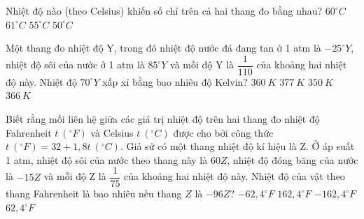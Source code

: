 \begin{vidu}
\begin{vdc}
 	\end{vdc}
 	\begin{vdc}
 		Nhiệt độ nào (theo Celsius) khiến số chỉ trên cả hai thang đo bằng nhau?
 		\choice
 		{$60^\circ C$}
 		{$61^\circ C$}
 		{$55^\circ C$}
 		{\True $50^\circ C$}

 	\end{vdc}
 \end{vidu}
 

\begin{vidu} 
	Một thang đo nhiệt độ Y, trong đó nhiệt độ nước đá đang tan ở 1 atm là  $-25^\circ Y$, nhiệt độ sôi của nước ở 1 atm là $85^\circ Y$ và mỗi độ Y là $\dfrac{1}{110}$ của khoảng hai nhiệt độ này. Nhiệt độ $70^\circ Y$ xấp xỉ bằng bao nhiêu độ Kelvin?
	\choice
	{\True $360 \ K$}
	{$377 \ K$}
	{$350 \ K$}
	{$366 \ K$}
\end{vidu}
\begin{vidu}
	Biết rằng mối liên hệ giữa các giá trị nhiệt độ trên hai thang đo nhiệt độ Fahrenheit $t\ (^\circ F)$ và Celsius $t\ (^\circ C)$ được cho bởi công thức $t\ (^\circ F)=32+1,8t\ (^\circ C)$. Giả sử có một thang nhiệt độ kí hiệu là Z. Ở áp suất 1 atm, nhiệt độ sôi của nước theo thang này là $60 Z$, nhiệt độ đóng băng của nước là $-15 Z$ và mỗi độ Z là $\dfrac{1}{75}$ của khoảng hai nhiệt độ này. Nhiệt độ của vật theo thang Fahrenheit là bao nhiêu nếu thang $Z$ là $-96 Z$?
	\choice
	{$-62,4^\circ F$}
	{$162,4^\circ F$}
	{\True $-162,4^\circ F$}
	{$62,4^\circ F$}
	\end{vidu}
